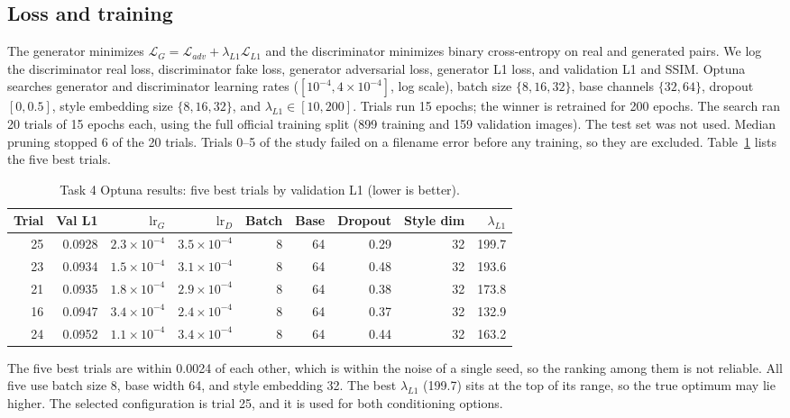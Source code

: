 \documentclass[conference]{IEEEtran}
\begin{document}
\subsection{Loss and training}
The generator minimizes $\mathcal{L}_G=\mathcal{L}_{adv}+\lambda_{L1}\mathcal{L}_{L1}$ and the
discriminator minimizes binary cross-entropy on real and generated pairs. We log the discriminator real
loss, discriminator fake loss, generator adversarial loss, generator L1 loss, and validation L1 and SSIM.
Optuna searches generator and discriminator learning rates ($[10^{-4},4\times10^{-4}]$, log scale), batch
size $\{8,16,32\}$, base channels $\{32,64\}$, dropout $[0,0.5]$, style embedding size $\{8,16,32\}$, and
$\lambda_{L1}\in[10,200]$. Trials run 15 epochs; the winner is retrained for 200 epochs.
The search ran 20 trials of 15 epochs each, using the full official training split (899 training and 159
validation images). The test set was not used. Median pruning stopped 6 of the 20 trials. Trials 0--5 of
the study failed on a filename error before any training, so they are excluded. Table~\ref{tab:t4optuna}
lists the five best trials.

\begin{table}[t]
\centering
\caption{Task 4 Optuna results: five best trials by validation L1 (lower is better).}
\label{tab:t4optuna}
\small
\begin{tabular}{@{}rrrrrrrrr@{}}
\toprule
Trial & Val L1 & $\mathrm{lr}_G$ & $\mathrm{lr}_D$ & Batch & Base & Dropout & Style dim & $\lambda_{L1}$ \\
\midrule
25 & 0.0928 & $2.3\times10^{-4}$ & $3.5\times10^{-4}$ & 8 & 64 & 0.29 & 32 & 199.7 \\
23 & 0.0934 & $1.5\times10^{-4}$ & $3.1\times10^{-4}$ & 8 & 64 & 0.48 & 32 & 193.6 \\
21 & 0.0935 & $1.8\times10^{-4}$ & $2.9\times10^{-4}$ & 8 & 64 & 0.38 & 32 & 173.8 \\
16 & 0.0947 & $3.4\times10^{-4}$ & $2.4\times10^{-4}$ & 8 & 64 & 0.37 & 32 & 132.9 \\
24 & 0.0952 & $1.1\times10^{-4}$ & $3.4\times10^{-4}$ & 8 & 64 & 0.44 & 32 & 163.2 \\
\bottomrule
\end{tabular}
\end{table}

The five best trials are within 0.0024 of each other, which is within the noise of a single seed, so the
ranking among them is not reliable. All five use batch size 8, base width 64, and style embedding 32. The
best $\lambda_{L1}$ (199.7) sits at the top of its range, so the true optimum may lie higher. The selected
configuration is trial 25, and it is used for both conditioning options.
\end{document}

